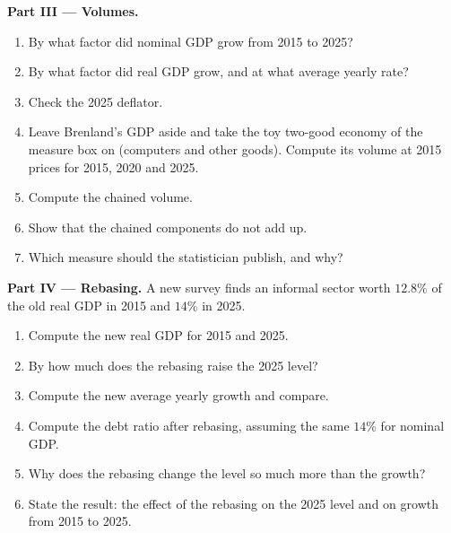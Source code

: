 \begin{problem}
\medskip\noindent\textbf{Part III --- Volumes.}
\begin{enumerate}[resume]
  \item By what factor did nominal GDP grow from 2015 to 2025?
  \item By what factor did real GDP grow, and at what average yearly rate?
  \item Check the 2025 deflator.
  \item Leave Brenland's GDP aside and take the toy two-good economy of the measure box on  (computers and other goods). Compute its volume at 2015 prices for 2015, 2020 and 2025.
  \item Compute the chained volume.
  \item Show that the chained components do not add up.
  \item Which measure should the statistician publish, and why?
\end{enumerate}

\medskip\noindent\textbf{Part IV --- Rebasing.} A new survey finds an informal
sector worth $12.8\%$ of the old real GDP in 2015 and $14\%$ in 2025.
\begin{enumerate}[resume]
  \item Compute the new real GDP for 2015 and 2025.
  \item By how much does the rebasing raise the 2025 level?
  \item Compute the new average yearly growth and compare.
  \item Compute the debt ratio after rebasing, assuming the same $14\%$ for nominal GDP.
  \item Why does the rebasing change the level so much more than the growth?
  \item State the result: the effect of the rebasing on the 2025 level and on growth from 2015 to 2025.
\end{enumerate}
\end{problem}
